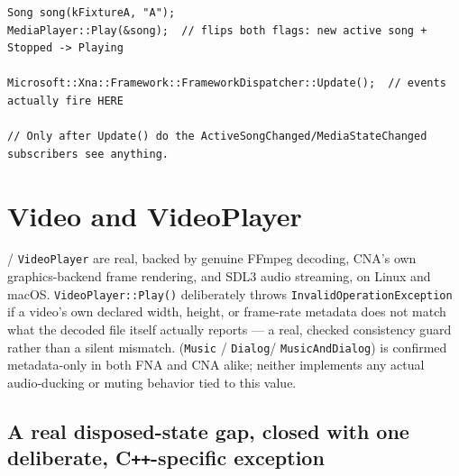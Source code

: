 \begin{lstlisting}
Song song(kFixtureA, "A");
MediaPlayer::Play(&song);  // flips both flags: new active song + Stopped -> Playing

Microsoft::Xna::Framework::FrameworkDispatcher::Update();  // events actually fire HERE

// Only after Update() do the ActiveSongChanged/MediaStateChanged subscribers see anything.
\end{lstlisting}

\section{Video and VideoPlayer}

 / \texttt{VideoPlayer} are real, backed by genuine FFmpeg decoding, CNA's own
graphics-backend frame rendering, and SDL3 audio streaming, on Linux and macOS.
\texttt{VideoPlayer::Play()} deliberately throws \texttt{InvalidOperationException} if a
video's own declared width, height, or frame-rate metadata does not match what the decoded
file itself actually reports --- a real, checked consistency guard rather than a silent
mismatch.  (\texttt{Music} / \texttt{Dialog}/%
\texttt{MusicAndDialog}) is confirmed metadata-only in both FNA and CNA alike; neither
implements any actual audio-ducking or muting behavior tied to this value.

\subsection{A real disposed-state gap, closed with one deliberate, C\texttt{++}-specific exception}

